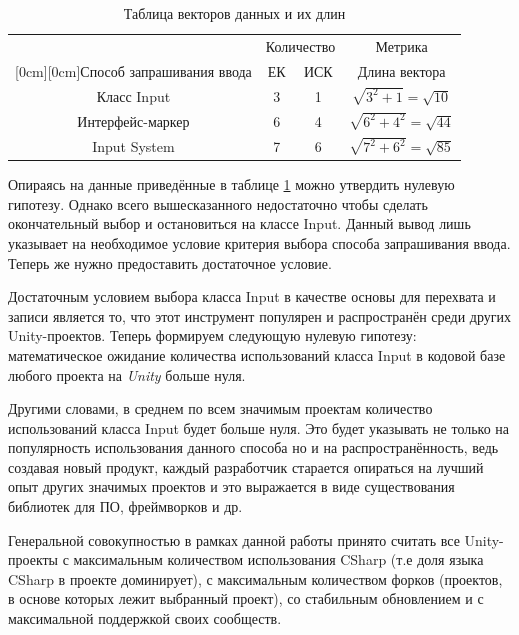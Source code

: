 \begin{table}[H]
	\caption{\label{tab:inputs}Таблица векторов данных и их длин}
	\begin{center}
		\begin{tabular}{|c|c|c|c|}
			\hline
			& \multicolumn{2}{c|}{Количество} & Метрика \\
			\cline{2-4}
			\raisebox{1.5ex}[0cm][0cm]{Способ запрашивания ввода}
			& ЕК & ИСК & Длина вектора \\
			\hline
			Класс Input & 3 & 1 & $\sqrt{3^2+1} = \sqrt{10}$ \\
			\hline
			Интерфейс-маркер & 6 & 4 & $\sqrt{6^2+4^2} = \sqrt{44}$ \\
			\hline
			Input System & 7 & 6 & $\sqrt{7^2+6^2} = \sqrt{85}$ \\
			\hline
		\end{tabular}
	\end{center}
\end{table}

Опираясь на данные приведённые в таблице \ref{tab:inputs} можно утвердить нулевую гипотезу. Однако всего вышесказанного недостаточно чтобы сделать окончательный выбор и остановиться на классе Input. Данный вывод лишь указывает на необходимое условие критерия выбора способа запрашивания ввода. Теперь же нужно предоставить достаточное условие.

Достаточным условием выбора класса Input в качестве основы для перехвата и записи является то, что этот инструмент популярен и распространён среди других Unity-проектов. Теперь формируем следующую нулевую гипотезу: математическое ожидание количества использований класса Input в кодовой базе любого проекта на \textit{Unity} больше нуля.

Другими словами, в среднем по всем значимым проектам количество использований класса Input будет больше нуля. Это будет указывать не только на популярность использования данного способа но и на распространённость, ведь создавая новый продукт, каждый разработчик старается опираться на лучший опыт других значимых проектов и это выражается в виде существования библиотек для ПО, фреймворков и др.

Генеральной совокупностью в рамках данной работы принято считать все Unity-проекты с максимальным количеством использования CSharp (т.е доля языка CSharp в проекте доминирует), с максимальным количеством форков (проектов, в основе которых лежит выбранный проект), со стабильным обновлением и с максимальной поддержкой своих сообществ. 

